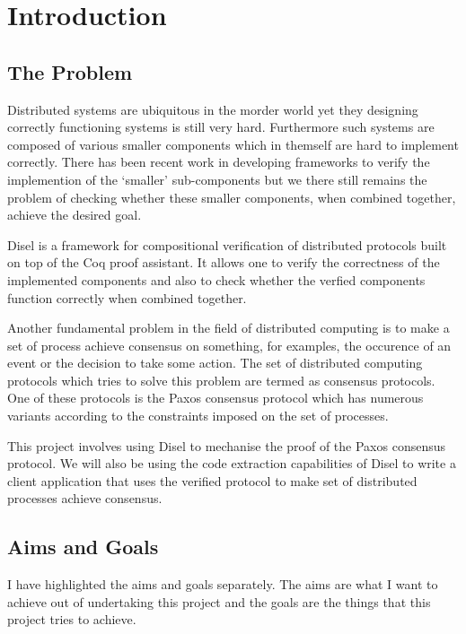 \chapter{Introduction}

\section{The Problem}
Distributed systems are ubiquitous in the morder world yet they designing
correctly functioning systems is still very hard. Furthermore such
systems are composed of various smaller components which in themself are
hard to implement correctly. There has been recent work in developing
frameworks to verify the implemention of the `smaller' sub-components
but we there still remains the problem of checking whether these smaller
components, when combined together, achieve the desired goal.

Disel is a framework for compositional verification of distributed
protocols built on top of the Coq proof assistant. It allows one to verify
the correctness of the implemented components and also to check whether
the verfied components function correctly when combined together.

Another fundamental problem in the field of distributed computing is to make
a set of process achieve consensus on something, for examples, the occurence
of an event or the decision to take some action. The set of distributed
computing protocols which tries to solve this problem are termed as
consensus protocols. One of these protocols is the Paxos consensus protocol
which has numerous variants according to the constraints imposed on the
set of processes.

This project involves using Disel to mechanise the proof of the Paxos consensus protocol.
We will also be using the code extraction capabilities of Disel to
write a client application that uses the verified protocol to make set of
distributed processes achieve consensus.

\section{Aims and Goals}
I have highlighted the aims and goals separately. The aims are what I want to
achieve out of undertaking this project and the goals are the things that this
project tries to achieve.


